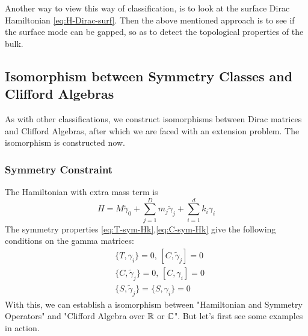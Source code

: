 \documentclass{article}
\begin{document}
Another way to view this way of classification, is to look at the surface
Dirac Hamiltonian \ref{eq:H-Dirac-surf}. Then the above mentioned approach is to
see if the surface mode can be gapped, so as to detect the topological
properties of the bulk.

\subsection{Isomorphism between Symmetry Classes and Clifford Algebras}
\label{sec:Isomorphism}
As with other classifications, we construct isomorphisms between Dirac matrices
and Clifford Algebras, after which we are faced with an extension problem. The
isomorphism is constructed now.
\subsubsection{Symmetry Constraint}
\label{sec:Symmetry Constraint}
The Hamiltonian with extra mass term is
\begin{equation}
    H = M\tilde{\gamma}_0 + \sum_{j=1}^D m_j\tilde{\gamma}_j
    + \sum_{i=1}^{d} k_i \gamma_i
\end{equation}
The symmetry properties \ref{eq:T-sym-Hk},\ref{eq:C-sym-Hk} give the following
conditions on the gamma matrices:
\begin{subequations}
    \label{eq:sym-spemt}
\begin{align}
    & \{T,\gamma_i \} = 0,\, [C,\tilde{\gamma}_j] =0 \\
    & \{C,\tilde{\gamma}_j \} = 0,\, [C,\gamma_i] =0 \\
    & \{S,\tilde{\gamma}_j \} = \{S,\gamma_i\} =0
\end{align}
\end{subequations}
With this, we can establish a isomorphism between "Hamiltonian and Symmetry
Operators" and "Clifford Algebra over $\mathbb{R}$ or $\mathbb{C}$".  But let's first see some
examples in action.
\end{document}
